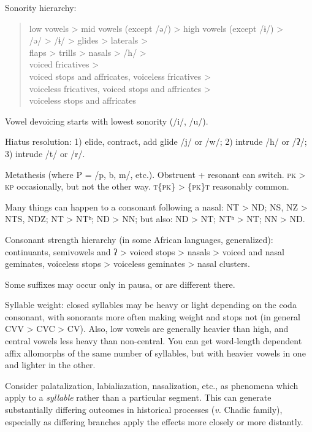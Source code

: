 \documentclass[11pt]{article}
\newcommand{\I}[1]{\textsc{#1}}   %
\begin{document}
Sonority hierarchy:
\begin{quotation}
\noindent low vowels > mid vowels (except /ə/) > high vowels (except /ɨ/) > \\
\indent /ə/ > /ɨ/ > glides > laterals > \\
\indent flaps > trills > nasals > /h/ > \\
\indent voiced fricatives > \\
\indent voiced stops and affricates, voiceless fricatives > \\
\indent voiceless fricatives, voiced stops and affricates > \\
\indent voiceless stops and affricates
\end{quotation}

Vowel devoicing starts with lowest sonority  (/i/, /u/).

Hiatus resolution: 1) elide, contract, add glide /j/ or /w/; 2)
intrude /h/ or /ʔ/; 3) intrude /t/ or /r/.

Metathesis (where P = /p, b, m/, etc.).  Obstruent + resonant can
switch.  \I{pk} > \I{kp} occasionally, but not the other way.
\I{t\{pk\}} > \I{\{pk\}t} reasonably common.

Many things can happen to a consonant following a nasal: NT > ND; NS,
NZ > NTS, NDZ; NT > NTʰ; ND > NN; but also: ND > NT; NTʰ > NT; NN >
ND.

Consonant strength hierarchy (in some African languages, generalized):
continuants, semivowels and ʔ > voiced stops > nasals > voiced and
nasal geminates, voiceless stops > voiceless geminates > nasal
clusters.

Some suffixes may occur only in pausa, or are different there.

Syllable weight: closed syllables may be heavy or light depending on
the coda consonant, with sonorants more often making weight and stops
not (in general CVV > CVC > CV).  Also, low vowels are generally
heavier than high, and central vowels less heavy than non-central. You
can get word-length dependent affix allomorphs of the same number of
syllables, but with heavier vowels in one and lighter in the other.

Consider palatalization, labialiazation, nasalization, etc., as
phenomena which apply to a \textit{syllable} rather than a particular
segment. This can generate substantially differing outcomes in
historical processes (\textit{v.} Chadic family), especially as
differing branches apply the effects more closely or more distantly. 
\end{document}
